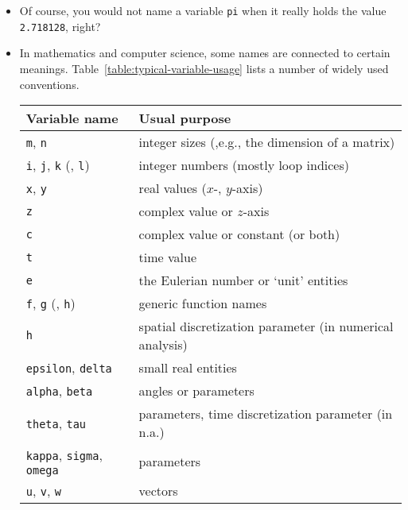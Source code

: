 \begin{itemize}
\item Of course, you would not name a variable \lstinline!pi! when it really holds the value \lstinline!2.718128!, right?

\item In mathematics and computer science, some names are connected to certain
  meanings. Table~\ref{table:typical-variable-usage} lists a number of widely
  used conventions.

\begin{table}
\centering
\begin{tabular}{ll}
\toprule
Variable name                                                 & Usual purpose\\\midrule
\lstinline!m!, \lstinline!n!                                  & integer sizes (,e.g., the dimension of a matrix)\\
\lstinline!i!, \lstinline!j!, \lstinline!k! (, \lstinline!l!) & integer numbers (mostly loop indices)\\
\lstinline!x!, \lstinline!y!                                  & real values ($x$-, $y$-axis)\\
\lstinline!z!                                                 & complex value or $z$-axis\\
\lstinline!c!                                                 & complex value or constant (or both)\\
\lstinline!t!                                                 & time value\\
\lstinline!e!                                                 & the Eulerian number or `unit' entities\\
\lstinline!f!, \lstinline!g! (, \lstinline!h!)                & generic function names\\
\lstinline!h!                                                 & spatial discretization parameter (in numerical analysis)\\
\lstinline!epsilon!, \lstinline!delta!                        & small real entities\\
\lstinline!alpha!, \lstinline!beta!                           & angles or parameters\\
\lstinline!theta!, \lstinline!tau!                            & parameters, time discretization parameter (in n.a.)\\
\lstinline!kappa!, \lstinline!sigma!, \lstinline!omega!       & parameters\\
\lstinline!u!, \lstinline!v!, \lstinline!w!                   & vectors\\

\end{tabular}
\end{table}
\end{itemize}
